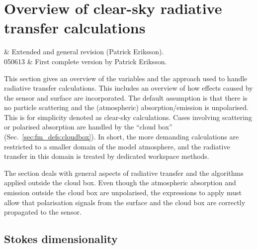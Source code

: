 \chapter{Overview of clear-sky radiative transfer 
calculations}
 \label{sec:rte}


  & Extended and general revision (Patrick Eriksson).\\
 050613 & First complete version by Patrick Eriksson.\\
 \stophistory

\graphicspath{{Figs/rte/}}

This section gives an overview of the variables and the approach used to handle
radiative transfer calculations. This includes an overview of how effects
caused by the sensor and surface are incorporated. The default assumption is
that there is no particle scattering and the (atmospheric) absorption/emission
is unpolarised. This is for simplicity denoted as clear-sky calculations. Cases
involving scattering or polarised absorption are handled by the ``cloud box''
(Sec.~\ref{sec:fm_defs:cloudbox}). In short, the more demanding calculations
are restricted to a smaller domain of the model atmosphere, and the radiative
transfer in this domain is treated by dedicated workspace methods.

The section deals with general aspects of radiative transfer and the
algorithms applied outside the cloud box. Even though the atmospheric absorption
and emission outside the cloud box are unpolarised, the expressions to apply
must allow that polarisation signals from the surface and the cloud box are
correctly propagated to the sensor.




\section{Stokes dimensionality}
\label{sec:fm_defs:polarisation}

